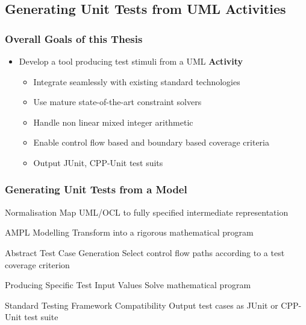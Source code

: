 \documentclass{beamer}
\newcommand{\UMLType}[1]{\textbf{#1}}
\begin{document}


\subsection{Generating Unit Tests from UML Activities}
\begin{frame}
\frametitle{Overall Goals of this Thesis}
\begin{itemize}
\item Develop a tool producing test stimuli from a UML \UMLType{Activity}
\begin{itemize}
\item Integrate seamlessly with existing standard technologies
\item Use mature state-of-the-art constraint solvers
\item Handle non linear mixed integer arithmetic
\item Enable control flow based and boundary based coverage criteria
\item Output JUnit, CPP-Unit test suits
\end{itemize}
\end{itemize}
\end{frame}

\begin{frame}
\frametitle{Generating Unit Tests from a \UMLType{Model}}
\begin{block}{Normalisation}
Map UML/OCL to fully specified intermediate representation
\end{block}
\begin{block}{AMPL Modelling}
Transform into a rigorous mathematical program
\end{block}
\begin{block}{Abstract Test Case Generation}
Select control flow paths according to a test coverage criterion 
\end{block}
\begin{block}{Producing Specific Test Input Values}
Solve mathematical program
\end{block}
\begin{block}{Standard Testing Framework Compatibility}
Output test cases as JUnit or CPP-Unit test suite
\end{block}
\end{frame}
\end{document}
